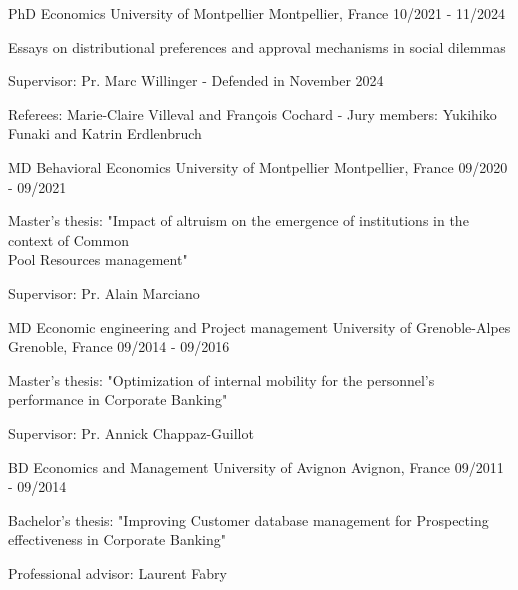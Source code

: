 

\begin{cventries}

  \cventry
    {PhD Economics} %
    {University of Montpellier} %
    {Montpellier, France} %
    {10/2021 - 11/2024} %
    {
      \begin{cvitems} %
        \item {Essays on distributional preferences and approval mechanisms in social dilemmas}
        \item {Supervisor: Pr. Marc Willinger - Defended in November 2024}
        \item {Referees: Marie-Claire Villeval and François Cochard - Jury members: Yukihiko Funaki and Katrin Erdlenbruch}
      \end{cvitems}
    }

  \cventry
    {MD Behavioral Economics} %
    {University of Montpellier} %
    {Montpellier, France} %
    {09/2020 - 09/2021} %
    {
      \begin{cvitems} %
        \item {Master's thesis: "Impact of altruism on the emergence of institutions in the context of Common \\ Pool Resources management"}
        \item {Supervisor: Pr. Alain Marciano}
      \end{cvitems}
    }

    \cventry
    {MD Economic engineering and Project management} %
    {University of Grenoble-Alpes} %
    {Grenoble, France} %
    {09/2014 - 09/2016} %
    {
      \begin{cvitems} %
        \item {Master's thesis: "Optimization of internal mobility for the personnel's performance in Corporate Banking"}
        \item {Supervisor: Pr. Annick Chappaz-Guillot}
      \end{cvitems}
    }

    \cventry
    {BD Economics and Management} %
    {University of Avignon} %
    {Avignon, France} %
    {09/2011 - 09/2014} %
    {
      \begin{cvitems} %
        \item {Bachelor's thesis: "Improving Customer database management for Prospecting effectiveness in Corporate Banking"}
        \item {Professional advisor: Laurent Fabry}
      \end{cvitems}
    }
\end{cventries}
